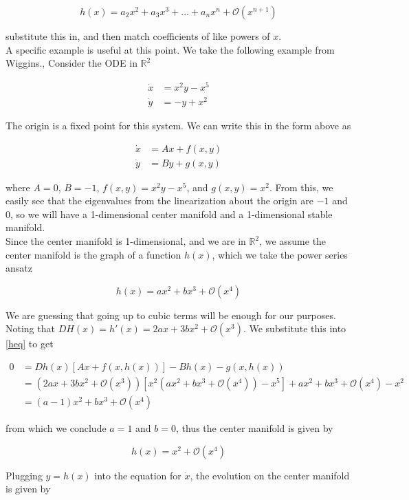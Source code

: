 \documentclass{article}
\def\R{{\mathbb R}}
\begin{document}
\[
h(x) = a_2 x^2 + a_3 x^3 + \dots + a_n x^n + \mathcal{O}(x^{n+1})
\]

substitute this in, and then match coefficients of like powers of $x$.\\

A specific example is useful at this point. We take the following example from Wiggins., Consider the ODE in $\R^2$

\begin{align}
\dot{x} &= x^2 y - x^5 \\
\dot{y} &= -y + x^2
\end{align}

The origin is a fixed point for this system. We can write this in the form above as

\begin{align}
\dot{x} &= Ax + f(x, y) \\
\dot{y} &= By + g(x, y)
\end{align}

where $A = 0$, $B = -1$, $f(x, y) = x^2 y - x^5$, and $g(x, y) = x^2$. From this, we easily see that the eigenvalues from the linearization about the origin are $-1$ and $0$, so we will have a 1-dimensional center manifold and a 1-dimensional stable manifold.\\

Since the center manifold is 1-dimensional, and we are in $\R^2$, we assume the center manifold is the graph of a function $h(x)$, which we take the power series ansatz

\[
h(x) = a x^2 + b x^3 + \mathcal{O}(x^4)
\]

We are guessing that going up to cubic terms will be enough for our purposes. Noting that $DH(x) = h'(x) = 2 a x + 3 b x^2 + \mathcal{O}(x^3)$. We substitute this into \eqref{heq} to get

\begin{align*}
0 &= Dh(x) [ Ax + f(x, h(x))] - Bh(x) - g(x, h(x)) \\
&= ( 2 a x + 3 b x^2 + \mathcal{O}(x^3) )[ x^2 (a x^2 + b x^3 + \mathcal{O}(x^4)) - x^5] + a x^2 + b x^3 + \mathcal{O}(x^4) - x^2 \\
&= (a-1)x^2 + b x^3 + \mathcal{O}(x^4)
\end{align*}

from which we conclude $a = 1$ and $b = 0$, thus the center manifold is given by

\[
h(x) = x^2 + \mathcal{O}(x^4)
\]

Plugging $y = h(x)$ into the equation for $\dot{x}$, the evolution on the center manifold is given by 
\end{document}
